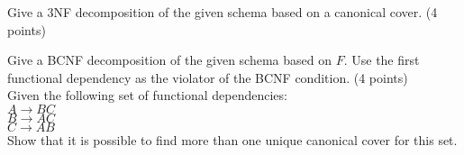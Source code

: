 \documentclass[a4 paper]{article}
\begin{document}


 Give a 3NF decomposition of the given schema based on a canonical cover. \indent (4 points)



 Give a BCNF decomposition of the given schema based on $F$. Use the first functional dependency as the violator of the BCNF condition. \indent (4 points)\\



Given the following set of functional dependencies:\\
$A \rightarrow BC$\\
$B \rightarrow AC$\\
$C \rightarrow AB$\\
Show that it is possible to find more than one unique canonical cover for this set.\\\\
\end{document}
